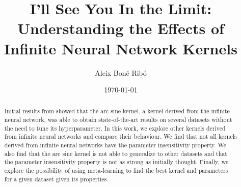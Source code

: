 \renewcommand\and{\\[\baselineskip]}

\title{I'll See You In the Limit:
 Understanding the Effects of Infinite Neural Network Kernels}
\author{Aleix Boné Ribó}
\date{\today}



\cleardoublepage

\cleardoublepage




\begin{abstract}
    Initial results from \textcite{frenayParameterinsensitiveKernelExtreme2011} showed that
    the arc sine kernel, a kernel derived from the infinite neural network, was able to
    obtain state-of-the-art results on several datasets without the need to tune its
    hyperparameter. In this work, we explore other kernels derived from infinite neural
    networks and compare their behaviour. We find that not all kernels derived from
    infinite neural networks have the parameter insensitivity property. We also find
    that the arc sine kernel is not able to generalize to other datasets and that
    the parameter insensitivity property is not as strong as initially thought.
    Finally, we explore the possibility of using meta-learning to find the best kernel
    and parameters for a given dataset given its properties.
\end{abstract}



